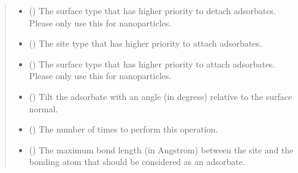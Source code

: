 \documentclass[letterpaper,10pt,english]{sphinxmanual}
\begin{document}
\begin{fulllineitems}
\begin{quote}
\begin{description}
\begin{itemize}
\item {} 
 (\sphinxstyleliteralemphasis{\sphinxupquote{, }}) \textendash{} The surface type that has higher priority to detach adsorbates.
Please only use this for nanoparticles.

\item {} 
 (\sphinxstyleliteralemphasis{\sphinxupquote{, }}) \textendash{} The site type that has higher priority to attach adsorbates.

\item {} 
 (\sphinxstyleliteralemphasis{\sphinxupquote{, }}) \textendash{} The surface type that has higher priority to attach adsorbates.
Please only use this for nanoparticles.

\item {} 
 (\sphinxstyleliteralemphasis{\sphinxupquote{, }}) \textendash{} Tilt the adsorbate with an angle (in degress) relative to the
surface normal.

\item {} 
 (\sphinxstyleliteralemphasis{\sphinxupquote{, }}) \textendash{} The number of times to perform this operation.

\item {} 
 (\sphinxstyleliteralemphasis{\sphinxupquote{, }}) \textendash{} The maximum bond length (in Angstrom) between the site and the
bonding atom  that should be considered as an adsorbate.

\end{itemize}

\end{description}\end{quote}


\end{fulllineitems}
\end{document}
